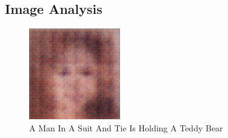 \documentclass{article}%
\begin{document}
%
\subsection{Image Analysis}%
\label{subsec:ImageAnalysis}%


\begin{figure}[h!]%
\centering%
\includegraphics[width=150px]{500_fake_images/samples_5_414.png}%
\caption{A Man In A Suit And Tie Is Holding A Teddy Bear}%
\end{figure}

%
\end{document}
